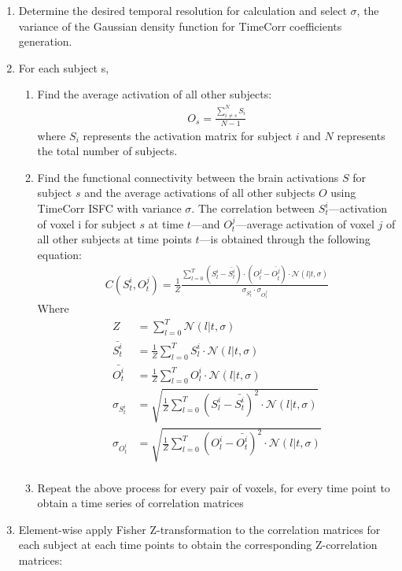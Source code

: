 \documentclass[11pt]{article}
\begin{document}
\begin{enumerate}
\item Determine the desired temporal resolution for calculation and select $\sigma$, the variance of the Gaussian density function for TimeCorr coefficients generation.
\item For each subject s,
\begin{enumerate}
\item Find the average activation of all other subjects:
\begin{align*}
O_s=\frac{\sum_{i\neq s}^N S_i}{N-1}
\end{align*}
where $S_i$ represents the activation matrix for subject $i$ and $N$ represents the total number of subjects.
\item Find the functional connectivity between the brain activations $S$ for subject $s$ and the average activations of all other subjects $O$ using TimeCorr ISFC with variance $\sigma$. The correlation between $S^i_t$---activation of voxel i for subject $s$ at time $t$---and $O^j_t$---average activation of voxel $j$ of all other subjects at time points $t$---is obtained through the following equation:
\begin{align*}
C(S^i_t,O^j_t) = \frac{1}{Z}\frac{\sum_{l=0}^T (S_l^i - \bar{S^i_t})\cdot(O^j_l - \bar{O^j_t})\cdot \mathcal{N}(l|t,\sigma)}{\sigma_{S_t^i} \cdot \sigma_{O_t^j}}
\end{align*}
Where
\begin{align*}
Z &= \sum_{l=0}^T \mathcal{N}(l|t,\sigma)\\
\bar{S^i_t} &=\frac{1}{Z} \sum_{l=0}^T S^i_l \cdot \mathcal{N}(l|t,\sigma)\\
\bar{O^i_t} &=\frac{1}{Z} \sum_{l=0}^T O^i_l \cdot \mathcal{N}(l|t,\sigma)\\
\sigma_{S_t^i} &=\sqrt{ \frac{1}{Z}\sum_{l=0}^T (S_l^i-\bar{S_t^i})^2 \cdot \mathcal{N}(l|t,\sigma)}\\
\sigma_{O_t^i} &=\sqrt{ \frac{1}{Z}\sum_{l=0}^T (O_l^i-\bar{O_t^i})^2 \cdot \mathcal{N}(l|t,\sigma)}\\
\end{align*}
\item Repeat the above process for every pair of voxels, for every time point to obtain a time series of correlation matrices
\end{enumerate}
\item Element-wise apply Fisher Z-transformation to the correlation matrices for each subject at each time points to obtain the corresponding Z-correlation matrices:

\end{enumerate}
\end{document}
